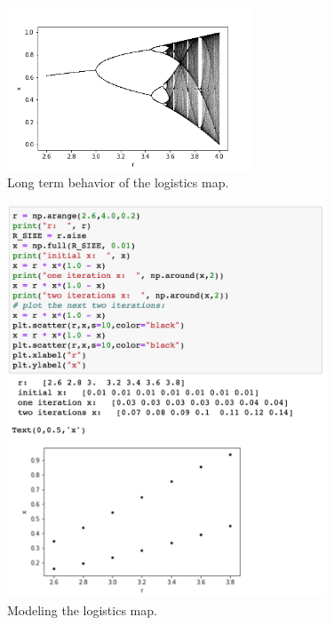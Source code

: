 \begin{figure}[htbp]
\begin{center}
\includegraphics[width=0.65\textwidth]{figs/labs//plotting/bifurcation.png} 
\caption{Long term behavior of the logistics map.}
\label{fig:logmap}
\end{center}
\end{figure}

\begin{figure}[htbp]
\begin{center}
\includegraphics[width=0.85\textwidth]{figs/labs//plotting/logmapstart.png} 
\caption{Modeling the logistics map.}
\label{fig:logmapstart}
\end{center}
\end{figure}

